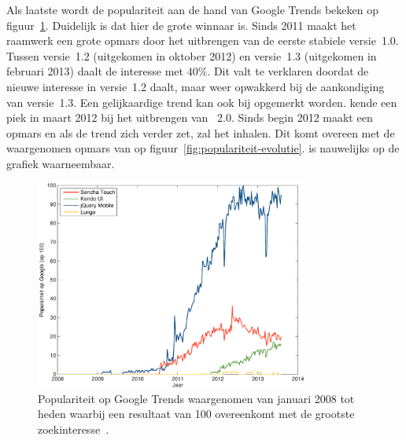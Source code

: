 Als laatste wordt de populariteit aan de hand van Google Trends bekeken op figuur~\ref{fig:google-trends}.
Duidelijk is dat hier \jqm{} de grote winnaar is.
Sinds 2011 maakt het raamwerk een grote opmars door het uitbrengen van de eerste stabiele versie~1.0.
Tussen versie~1.2 (uitgekomen in oktober 2012) en versie~1.3 (uitgekomen in februari 2013) daalt de interesse met $40\%$.
Dit valt te verklaren doordat de nieuwe interesse in versie~1.2 daalt, maar weer opwakkerd bij de aankondiging van versie~1.3. 
Een gelijkaardige trend kan ook bij \st{} opgemerkt worden.
\st{} kende een piek in maart 2012 bij het uitbrengen van \st{}~2.0.
Sinds begin 2012 maakt \kendo{} een opmars en als de trend zich verder zet, zal het \st{} inhalen.
Dit komt overeen met de waargenomen opmars van \kendo{} op figuur~\ref{fig:populariteit-evolutie}.
\lungo{} is nauwelijks op de grafiek waarneembaar.

\begin{figure}
  \centering
  \includegraphics[width=0.8\textwidth]{figuren/google-trends.pdf}
  \caption{Populariteit op Google Trends waargenomen van januari 2008 tot heden waarbij een resultaat van 100 overeenkomt met de grootste zoekinteresse~\cite{Google2012a}.}
  \label{fig:google-trends}
\end{figure}